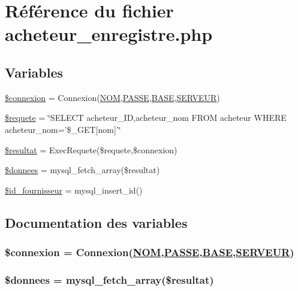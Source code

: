 \hypertarget{acheteur__enregistre_8php}{
\section{R\'{e}f\'{e}rence du fichier acheteur\_\-enregistre.php}
\label{acheteur__enregistre_8php}
}
\subsection*{Variables}
\begin{CompactItemize}
\item 
\hyperlink{acheteur__enregistre_8php_a0}{\$connexion} = Connexion(\hyperlink{pma__connect_8php_a0}{NOM},\hyperlink{pma__connect_8php_a1}{PASSE},\hyperlink{pma__connect_8php_a3}{BASE},\hyperlink{pma__connect_8php_a2}{SERVEUR})
\item 
\hyperlink{acheteur__enregistre_8php_a1}{\$requete} = \char`\"{}SELECT acheteur\_\-ID,acheteur\_\-nom FROM acheteur WHERE acheteur\_\-nom='\$\_\-GET\mbox{[}nom\mbox{]}'\char`\"{}
\item 
\hyperlink{acheteur__enregistre_8php_a2}{\$resultat} = Exec\-Requete(\$requete,\$connexion)
\item 
\hyperlink{acheteur__enregistre_8php_a3}{\$donnees} = mysql\_\-fetch\_\-array(\$resultat)
\item 
\hyperlink{acheteur__enregistre_8php_a4}{\$id\_\-fournisseur} = mysql\_\-insert\_\-id()
\end{CompactItemize}


\subsection{Documentation des variables}
\hypertarget{acheteur__enregistre_8php_a0}{
\subsubsection[\$connexion]{\setlength{\rightskip}{0pt plus 5cm}\$connexion = Connexion(\hyperlink{pma__connect_8php_a0}{NOM},\hyperlink{pma__connect_8php_a1}{PASSE},\hyperlink{pma__connect_8php_a3}{BASE},\hyperlink{pma__connect_8php_a2}{SERVEUR})}}
\label{acheteur__enregistre_8php_a0}


\hypertarget{acheteur__enregistre_8php_a3}{
\subsubsection[\$donnees]{\setlength{\rightskip}{0pt plus 5cm}\$donnees = mysql\_\-fetch\_\-array(\$resultat)}}
\label{acheteur__enregistre_8php_a3}


